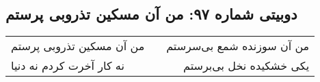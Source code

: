 \begin{center}
\section*{دوبیتی شماره ۹۷: من آن مسکین تذروبی پرستم}
\label{sec:097}
\begin{longtable}{l p{0.5cm} r}
من آن مسکین تذروبی پرستم
&&
من آن سوزنده شمع بی‌سرستم
\\
نه کار آخرت کردم نه دنیا
&&
یکی خشکیده نخل بی‌برستم
\\
\end{longtable}
\end{center}
